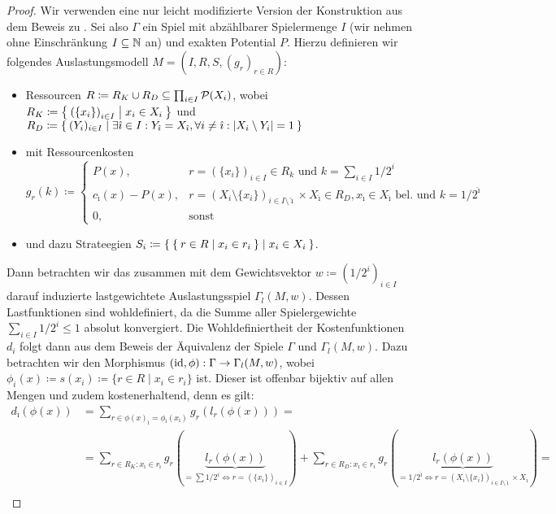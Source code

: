 \begin{proof}
	Wir verwenden eine nur leicht modifizierte Version der Konstruktion aus dem Beweis zu . Sei also $\Gamma$ ein Spiel mit abzählbarer Spielermenge $I$ (wir nehmen ohne Einschränkung $I \subseteq \mathbb{N}$ an) und exakten Potential $P$. Hierzu definieren wir folgendes Auslastungsmodell $M = (I, R, S, (g_r)_{r \in R})$:
	\begin{itemize}
		\item Ressourcen $R \coloneqq R_K \cup R_D \subseteq \prod_{i \in I}\mathcal{P}(X_i)$, wobei $R_K \coloneqq \Set{\left(\{x_i\}\right)_{i \in I} | x_i \in X_i }$ und \\ $R_D \coloneqq \Set{(Y_i)_{i \in I} | \exists \hat{\imath} \in I: Y_{\hat{\imath}} = X_{\hat{\imath}}, \forall i \neq \hat{\imath}: \left|X_i \setminus Y_i\right| = 1 }$
		\item mit Ressourcenkosten
		\[g_r(k) \coloneqq 
		\begin{cases}
		P(x), 					&r = \left(\{x_i\}\right)_{i \in I} \in R_k 													\text{ und } k=\sum_{i \in I} 1/2^i \\
		c_{\hat{\imath}}(x) - P(x), 	&r = \left(X_i\setminus\{x_i\}\right)_{i \in I\setminus\hat{\imath}} \times X_{\hat{\imath}} \in R_D, x_{\hat{\imath}} \in X_{\hat{\imath}} \text{ bel. und } k=1/2^{\hat{\imath}} \\
		0,						&\text{sonst}
		\end{cases}
		\]
		\item und dazu Strateegien $S_i \coloneqq \Set{ \Set{r \in R | x_i \in r_i} | x_i \in X_i }$.
	\end{itemize}
	Dann betrachten wir das zusammen mit dem Gewichtsvektor $w \coloneqq (1/2^i)_{i \in I}$ darauf induzierte lastgewichtete Auslastungsspiel $\Gamma_l(M, w)$. Dessen Lastfunktionen sind wohldefiniert, da die Summe aller Spielergewichte $\sum_{i \in I} 1/2^i \leq 1$ absolut konvergiert. Die Wohldefiniertheit der Kostenfunktionen $d_i$ folgt dann aus dem Beweis der Äquivalenz der Spiele $\Gamma$ und $\Gamma_l(M, w)$. Dazu betrachten wir den Morphismus $(\mathrm{id}, \phi): \Gamma \to \Gamma_l(M, w)$, wobei $\phi_i(x) \coloneqq s(x_i) \coloneqq \{r \in R \mid x_i \in r_i\}$ ist. Dieser ist offenbar bijektiv auf allen Mengen und zudem kostenerhaltend, denn es gilt:
	\begin{align*}
	d_{\hat{\imath}}(\phi(x)) 	&=\sum_{r \in \phi(x)_{\hat{\imath}} = \phi_{\hat{\imath}}(x_{\hat{\imath}})} g_r(l_r(\phi(x))) = \\
	&=\sum_{r \in R_K: x_{\hat{\imath}} \in r_{\hat{\imath}}} g_r(\underbrace{l_r(\phi(x))}_{= \sum 1/2^i \iff r = \left(\{x_i\}\right)_{i \in I}}) + \sum_{r \in R_D: x_{\hat{\imath}} \in r_i} g_r(\underbrace{l_r(\phi(x))}_{=1/2^{\hat{\imath}} \iff r = \left(X_i\setminus\{x_i\}\right)_{i \in I\setminus\hat{\imath}} \times X_{\hat{\imath}}}) = \\

\end{align*}
\end{proof}
